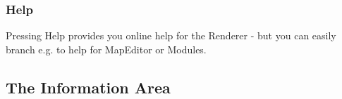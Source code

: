 



\subsubsection{Help}

Pressing Help provides you online help for the Renderer - but you can easily branch e.g. to help for
MapEditor or Modules. 

\clearpage

\subsection{The Information Area}

